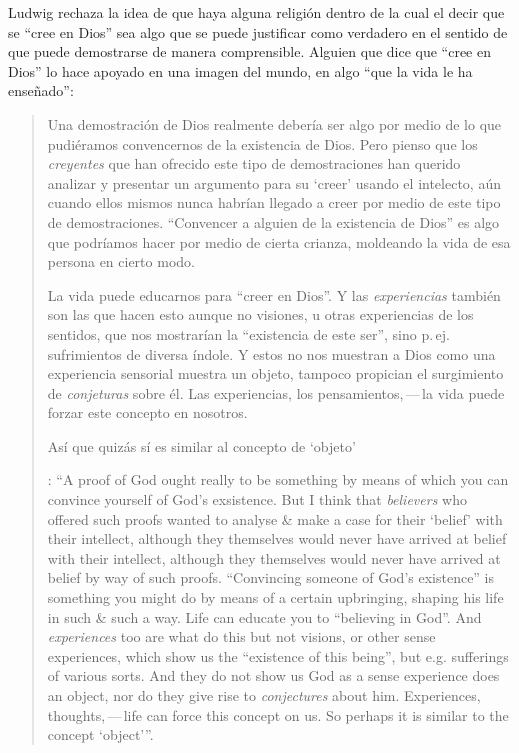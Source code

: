 Ludwig rechaza la idea de que haya alguna religión dentro de la cual el decir que se ``cree en Dios'' sea algo que se puede justificar como verdadero en el sentido de que puede demostrarse de manera comprensible. Alguien que dice que ``cree en Dios'' lo hace apoyado en una imagen del mundo, en algo ``que la vida le ha enseñado'': \blockquote[{\Cite[97]{wittgenstein1998cnv}}: \enquote{A proof of God ought really to be something by means of which you can convince yourself of God's exsistence. But I think that \emph{believers} who offered such proofs wanted to analyse \& make a case for their `belief' with their intellect, although they themselves would never have arrived at belief with their intellect, although they themselves would never have arrived at belief by way of such proofs. ``Convincing someone of God's existence'' is something you might do by means of a certain upbringing, shaping his life in such \& such a way.
Life can educate you to ``believing in God''. And \emph{experiences} too are what do this but not visions, or other sense experiences, which show us the ``existence of this being'', but e.g. sufferings of various sorts. And they do not show us God as a sense experience does an object, nor do they give rise to \emph{conjectures} about him. Experiences, thoughts,\,---\,life can force this concept on us.
So perhaps it is similar to the concept `object'}.]{Una demostración de Dios realmente debería ser algo por medio de lo que pudiéramos convencernos de la existencia de Dios. Pero pienso que los \emph{creyentes} que han ofrecido este tipo de demostraciones han querido analizar y presentar un argumento para su `creer' usando el intelecto, aún cuando ellos mismos nunca habrían llegado a creer por medio de este tipo de demostraciones. ``Convencer a alguien de la existencia de Dios'' es algo que podríamos hacer por medio de cierta crianza, moldeando la vida de esa persona en cierto modo.

La vida puede educarnos para ``creer en Dios''. Y las \emph{experiencias} también son las que hacen esto aunque no visiones, u otras experiencias de los sentidos, que nos mostrarían la ``existencia de este ser'', sino p.\,ej. sufrimientos de diversa índole. Y estos no nos muestran a Dios como una experiencia sensorial muestra un objeto, tampoco propician el surgimiento de \emph{conjeturas} sobre él. Las experiencias, los pensamientos,\,---\,la vida puede forzar este concepto en nosotros.

Así que quizás sí es similar al concepto de `objeto'}.

